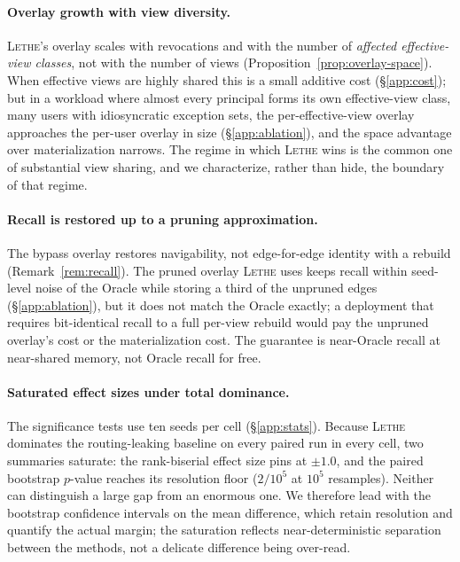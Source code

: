 \documentclass[sigconf, nonacm, review]{acmart}
\begin{document}
\paragraph{Overlay growth with view diversity.}
\textsc{Lethe}'s overlay scales with revocations and with the number of
\emph{affected effective-view classes}, not with the number of views
(Proposition~\ref{prop:overlay-space}). When effective views are highly shared
this is a small additive cost (\S\ref{app:cost}); but in a workload where almost
every principal forms its own effective-view class, many users with
idiosyncratic exception sets, the per-effective-view overlay approaches the
per-user overlay in size (\S\ref{app:ablation}), and the space advantage over
materialization narrows. The regime in which \textsc{Lethe} wins is the common
one of substantial view sharing, and we characterize, rather than hide, the
boundary of that regime.

\paragraph{Recall is restored up to a pruning approximation.}
The bypass overlay restores navigability, not edge-for-edge identity with a
rebuild (Remark~\ref{rem:recall}). The pruned overlay \textsc{Lethe} uses keeps
recall within seed-level noise of the Oracle while storing a third of the
unpruned edges (\S\ref{app:ablation}), but it does not match the Oracle exactly;
a deployment that requires bit-identical recall to a full per-view rebuild would
pay the unpruned overlay's cost or the materialization cost. The guarantee is
near-Oracle recall at near-shared memory, not Oracle recall for free.

\paragraph{Saturated effect sizes under total dominance.}
The significance tests use ten seeds per cell (\S\ref{app:stats}). Because
\textsc{Lethe} dominates the routing-leaking baseline on every paired run in
every cell, two summaries saturate: the rank-biserial effect size pins at
$\pm1.0$, and the paired bootstrap $p$-value reaches its resolution floor
($2/10^5$ at $10^5$ resamples). Neither can distinguish a large gap from an
enormous one. We therefore lead with the bootstrap confidence intervals on the
mean difference, which retain resolution and quantify the actual margin; the
saturation reflects near-deterministic separation between the methods, not a
delicate difference being over-read.
\end{document}
